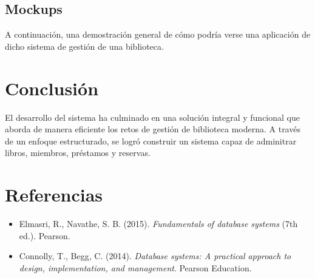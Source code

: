 \documentclass[12pt, a4paper]{article}
\begin{document}
\newpage

\subsection{Mockups}
A continuación, una demostración general de cómo podría verse una aplicación de dicho sistema de gestión de una biblioteca.



\section{Conclusión}
El desarrollo del sistema ha culminado en una solución integral y funcional que aborda de manera eficiente los retos de gestión de biblioteca moderna. A través de un enfoque estructurado, se logró construir un sistema capaz de adminitrar libros, miembros, préstamos y reservas.

\section{Referencias}
\begin{itemize}
\item Elmasri, R., Navathe, S. B. (2015). \textit{Fundamentals of database systems} (7th ed.). Pearson.
\item Connolly, T., Begg, C. (2014). \textit{Database systems: A practical approach to design, implementation, and management}. Pearson Education.
\end{itemize}
\end{document}
